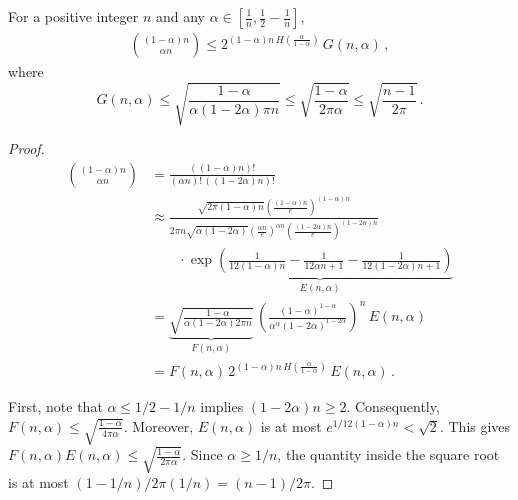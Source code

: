 \begin{corollary}\label{coro:nchoosek_2}
For a positive integer $n$ and any $\alpha \in [\frac{1}{n},\frac{1}{2} - \frac{1}{n}]$, 
\begin{align}\label{eq:nck_2}
{(1-\alpha)n \choose \alpha n} \leq 2^{(1-\alpha)n\,H\left( \frac{\alpha}{1-\alpha} \right)}\, G(n, \alpha)\,,
\end{align}
where \[
 G(n,\alpha) \leq \sqrt{\frac{1-\alpha}{\alpha(1-2\alpha) \pi n} } \leq \sqrt{\frac{1-\alpha}{ 2 \pi \alpha} } \leq \sqrt{ \frac{n-1}{2 \pi} }\, . 
 \]
\end{corollary}
\begin{proof}

\begin{align*}
{(1-\alpha)n \choose \alpha n}
&= \frac{((1-\alpha)n)!}{(\alpha n)!\, \left( (1-2\alpha)n \right)! }\\
&\approx \frac{\sqrt{2\pi (1-\alpha)n}(\frac{(1-\alpha)n}{e})^{(1-\alpha)n}}{2\pi n\sqrt{\alpha (1-2\alpha)}(\frac{\alpha n}{e})^{\alpha n}(\frac{(1-2\alpha)n}{e})^{(1-2\alpha)n} } \\
&\qquad \cdot \underbrace{ \exp\left( \frac{1}{12(1-\alpha)n} - \frac{1}{12\alpha n + 1} - \frac{1}{12(1-2\alpha)n+1}\right) }_{E(n,\alpha)}  \\
&= \underbrace{ \sqrt{\frac{1-\alpha}{\alpha(1-2\alpha) 2 \pi n} } }_{F(n, \alpha)}\, \left( \frac{(1-\alpha)^{1-\alpha}}{\alpha^\alpha (1-2\alpha)^{1-2\alpha}} \right)^n\, E(n, \alpha)\\
&=F(n, \alpha) \, 2^{(1-\alpha)n\,H\left( \frac{\alpha}{1-\alpha} \right)} \, E(n, \alpha)\, .
\end{align*}

First, note that $\alpha \leq 1/2 - 1/n$ implies $(1-2\alpha)n \geq 2$. Consequently, $F(n, \alpha) \leq \sqrt{\frac{1-\alpha}{ 4 \pi \alpha} }$. Moreover, $E(n,\alpha)$ is at most $e^{1/12(1-\alpha)n} < \sqrt{2}$. This gives $F(n, \alpha)E(n, \alpha) \leq \sqrt{\frac{1-\alpha}{ 2 \pi \alpha} }$. Since $\alpha \geq 1/n$, the quantity inside the square root is at most $(1-1/n)/2 \pi(1/n) = (n-1)/2\pi$.

\end{proof}

